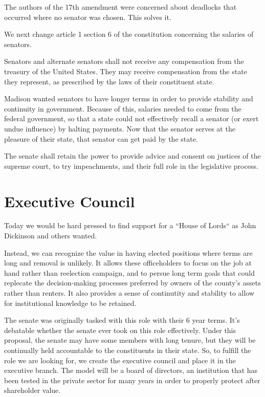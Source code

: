 \documentclass{article}
\begin{document}
The authors of the 17th amendment were concerned about deadlocks that occurred where no senator was chosen. This solves it.

We next change article 1 section 6 of the constitution concerning the salaries of senators.

\begin{quoting}
Senators and alternate senators shall not receive any compensation from the treasury of the United States. They may receive compensation from the state they represent, as prescribed by the laws of their constituent state.
\end{quoting}

Madison wanted senators to have longer terms in order to provide stability and continuity in government. Because of this, salaries needed to come from the federal government, so that a state could not effectively recall a senator (or exert undue influence) by halting payments. Now that the senator serves at the pleasure of their state, that senator can get paid by the state.

\begin{quoting}
The senate shall retain the power to provide advice and consent on justices of the supreme court, to try impeachments, and their full role in the legislative process.
\end{quoting}

\section{Executive Council}

Today we would be hard pressed to find support for a “House of Lords“ as John Dickinson and others wanted.

Instead, we can recognize the value in having elected positions where terms are long and removal is unlikely. It allows these officeholders to focus on the job at hand rather than reelection campaign, and to persue long term goals that could replecate the decision-making processes preferred by owners of the county's assets rather than renters. It also provides a sense of continutity and stability to allow for institutional knowledge to be retained.

The senate was originally tasked with this role with their 6 year terms. It's debatable whether the senate ever took on this role effectively. Under this proposal, the senate may have some members with long tenure, but they will be continually held accountable to the constituents in their state. So, to fulfill the role we are looking for, we create the executive council and place it in the executive branch. The model will be a board of directors, an institution that has been tested in the private sector for many years in order to properly protect after shareholder value.
\end{document}

